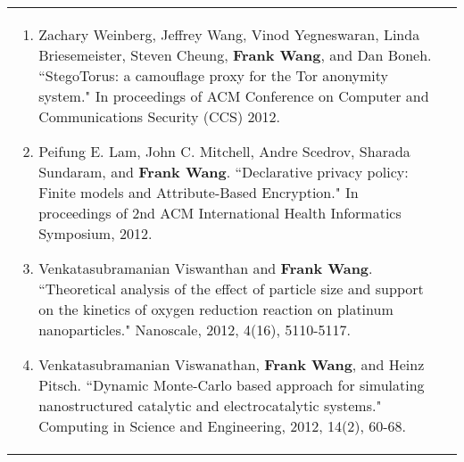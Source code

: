 \documentclass[a4paper,10pt]{article}
\begin{document}
\begin{longtable}{ p{0.9in} l }
\begin{minipage}[t]{0.78 \textwidth}
\begin{enumerate}[leftmargin=*]
\item{Zachary Weinberg, Jeffrey Wang, Vinod Yegneswaran, Linda Briesemeister, Steven Cheung, \textbf{Frank Wang}, and Dan Boneh. ``StegoTorus: a camouflage proxy for the Tor anonymity system." In proceedings of ACM Conference on Computer and Communications Security (CCS) 2012.}

\item{Peifung E. Lam, John C. Mitchell, Andre Scedrov, Sharada Sundaram, and \textbf{Frank Wang}. ``Declarative privacy policy: Finite models and Attribute-Based Encryption." In proceedings of 2nd ACM International Health Informatics Symposium, 2012.}

\item{Venkatasubramanian Viswanthan and \textbf{Frank Wang}. ``Theoretical analysis of the effect of particle size and support on the kinetics of oxygen reduction reaction on platinum nanoparticles." Nanoscale, 2012, 4(16), 5110-5117.}

\item{Venkatasubramanian Viswanathan, \textbf{Frank Wang}, and Heinz Pitsch. ``Dynamic Monte-Carlo based approach for simulating nanostructured catalytic and electrocatalytic systems." Computing in Science and Engineering, 2012, 14(2), 60-68.}

\end{enumerate}
\end{minipage} \tabularnewline

\end{longtable} 
\end{document}
